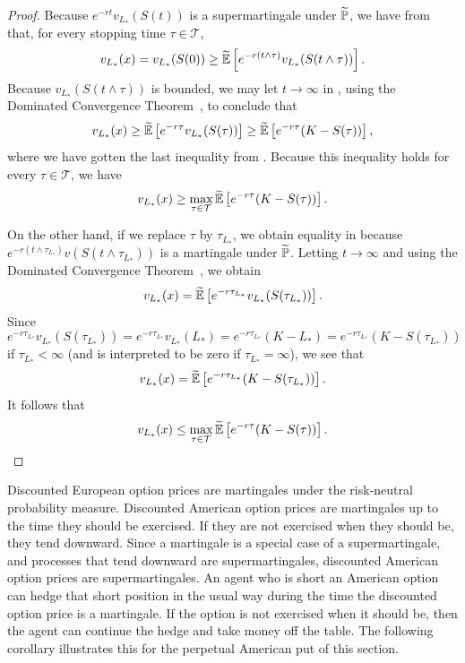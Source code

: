 \begin{proof}
	Because \(e^{-rt}v_{L_*}(S(t))\) is a supermartingale under \(\widetilde{\mathbb{P}}\), we have from  that, for every stopping time \(\tau \in \mathcal{T}\),
	\begin{equation} \label{SupermartingaleOptionalSampling}
		v_{L_*}(x) = v_{L_*}(S(0)) \ge \widetilde{\mathbb{E}} \left[e^{-r(t\land\tau)}v_{L_*}(S(t \land \tau))\right].
	\end{equation}
	Because \(v_{L_*}(S(t \land \tau))\) is bounded, we may let \(t \to \infty\) in , using the Dominated Convergence Theorem~, to conclude that
	\[
		v_{L_*}(x) \ge \widetilde{\mathbb{E}} \left[e^{-r\tau}v_{L_*}(S(\tau))\right] \ge \widetilde{\mathbb{E}} \left[e^{-r\tau}(K - S(\tau))\right],
	\]
	where we have gotten the last inequality from . Because this inequality holds for every \(\tau \in \mathcal{T}\), we have
	\[
		v_{L_*}(x) \ge \max_{\tau \in \mathcal{T}} \widetilde{\mathbb{E}} \left[e^{-r\tau}(K - S(\tau))\right].
	\]

	On the other hand, if we replace \(\tau\) by \(\tau_{L_*}\), we obtain equality in  because \(e^{-r(t\land\tau_{L_*})}v(S(t \land \tau_{L_*}))\) is a martingale under \(\widetilde{\mathbb{P}}\). Letting \(t \to \infty\) and using the Dominated Convergence Theorem~, we obtain
	\[
		v_{L_*}(x) = \widetilde{\mathbb{E}} \left[e^{-r\tau_{L_*}}v_{L_*}(S(\tau_{L_*}))\right].
	\]
	Since
	\[
		e^{-r\tau_{L_*}}v_{L_*}(S(\tau_{L_*})) = e^{-r\tau_{L_*}}v_{L_*}(L_*) = e^{-r\tau_{L_*}}(K - L_*) = e^{-r\tau_{L_*}}(K - S(\tau_{L_*}))
	\]
	if \(\tau_{L_*} < \infty\) (and is interpreted to be zero if \(\tau_{L_*} = \infty\)), we see that
	\begin{equation} \label{eq:ValueAtOptimalStopping}
		v_{L_*}(x) = \widetilde{\mathbb{E}} \left[e^{-r\tau_{L_*}}(K - S(\tau_{L_*}))\right].
	\end{equation}
	It follows that
	\[
		v_{L_*}(x) \le \max_{\tau \in \mathcal{T}} \widetilde{\mathbb{E}} \left[e^{-r\tau}(K - S(\tau))\right].
	\]
\end{proof}

Discounted European option prices are martingales under the risk-neutral probability measure. Discounted American option prices are martingales up to the time they should be exercised. If they are not exercised when they should be, they tend downward. Since a martingale is a special case of a supermartingale, and processes that tend downward are supermartingales, discounted American option prices are supermartingales. An agent who is short an American option can hedge that short position in the usual way during the time the discounted option price is a martingale. If the option is not exercised when it should be, then the agent can continue the hedge and take money off the table. The following corollary illustrates this for the perpetual American put of this section.


